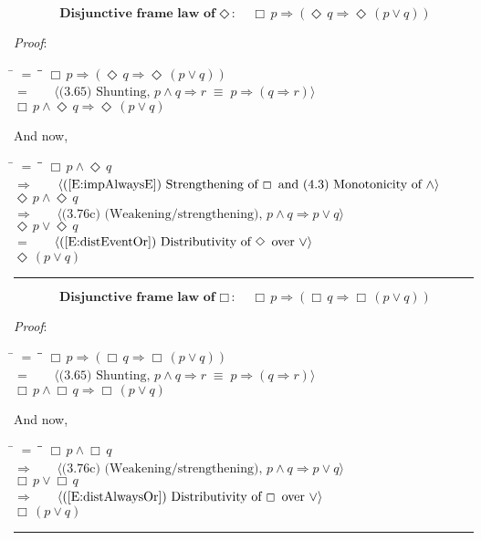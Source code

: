 \documentclass[12pt, fleqn, leqno]{article}
\newcommand{\lgap}{2pt}                             %
\newcommand{\mymathindent}{24pt}                    %
\newcommand{\equivs}{\ensuremath{\;\equiv\;}}       %
\newcommand{\impl}{\ensuremath{\Rightarrow}}        %
\newcommand{\Event}{\Diamond\,}
\newcommand{\Always}{\Box\,}
\newcommand{\myqed}{\rule[-.23ex]{1.2ex}{2.0ex}}
\newcommand{\myqedtab}{\hspace{384pt}}              %
\newcommand{\Gll} {\langle}                         %
\newcommand{\Ggg} {\rangle}                         %
\newcommand{\Hint}[1]     {\ \ \ $\Gll              \mbox{#1} \Ggg$ }   %
\begin{document}
\begin{equation}\label{E:disjframelawEvent}
\textbf{Disjunctive frame law of $\Event$:}\quad \Always p \impl (\Event q \impl \Event (p \lor q))
\end{equation}

\emph{Proof}:
\begin{tabbing}
\hspace{\mymathindent} \= $= \;$ \= \myqedtab \= \kill
  \> \>   $\Always p \impl (\Event q \impl \Event (p \lor q))$\\[\lgap]
  \> $=$  \>  \Hint{(3.65) Shunting, $p\land q\impl r\equivs p\impl (q\impl r)$}\\[\lgap]
  \> \>   $\Always p \land \Event q \impl \Event (p \lor q)$
\end{tabbing}
And now,
\begin{tabbing}
\hspace{\mymathindent} \= $= \;$ \= \myqedtab \= \kill
  \> \>   $\Always p \land \Event q $\\[\lgap]
  \> $\impl$  \>  \Hint{(\ref{E:impAlwaysE}) Strengthening of $\Always$ and (4.3) Monotonicity of $\land$}\\[\lgap]
  \> \>   $\Event p \land \Event q $\\[\lgap]
   \> $\impl$ \> \Hint{(3.76c) (Weakening/strengthening), $p\land q \impl p \lor q$} \\[\lgap]
   \> \>   $\Event p \lor \Event q $\\[\lgap]
  \> $=$  \>  \Hint{(\ref{E:distEventOr}) Distributivity of $\Event$ over $\lor$}\\[\lgap]
  \> \>   $\Event (p \lor q)$\quad \myqed
\end{tabbing}

\begin{equation}\label{E:disjframelawAlways}
\textbf{Disjunctive frame law of $\Always$:}\quad \Always p \impl (\Always q \impl \Always (p \lor q))
\end{equation}

\emph{Proof}:
\begin{tabbing}
\hspace{\mymathindent} \= $= \;$ \= \myqedtab \= \kill
  \> \>   $\Always p \impl (\Always q \impl \Always (p \lor q))$\\[\lgap]
  \> $=$  \>  \Hint{(3.65) Shunting, $p\land q\impl r\equivs p\impl (q\impl r)$}\\[\lgap]
  \> \>   $\Always p \land \Always q \impl \Always (p \lor q)$
\end{tabbing}
And now,
\begin{tabbing}
\hspace{\mymathindent} \= $= \;$ \= \myqedtab \= \kill
  \> \>   $\Always p \land \Always q $\\[\lgap]
   \> $\impl$ \> \Hint{(3.76c) (Weakening/strengthening), $p\land q \impl p \lor q$} \\[\lgap]
   \> \>   $\Always p \lor \Always q $\\[\lgap]
  \> $\impl$  \>  \Hint{(\ref{E:distAlwaysOr}) Distributivity of $\Always$ over $\lor$}\\[\lgap]
  \> \>   $\Always (p \lor q)$\quad \myqed
\end{tabbing}
\end{document}
